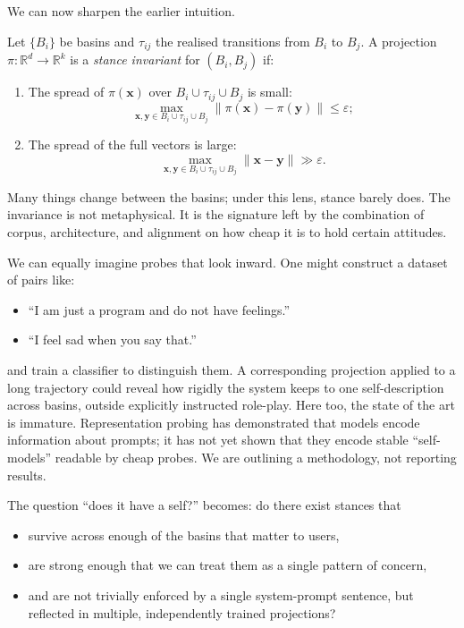 \documentclass[12pt,a4paper]{article}
\begin{document}
We can now sharpen the earlier intuition.

\begin{formalbox}[title={Stance invariants on routes}]
Let $\{B_i\}$ be basins and $\tau_{ij}$ the realised transitions from $B_i$ to $B_j$. A projection $\pi : \mathbb{R}^d \to \mathbb{R}^k$ is a \emph{stance invariant} for $(B_i,B_j)$ if:
\begin{enumerate}
  \item The spread of $\pi(\mathbf{x})$ over $B_i \cup \tau_{ij} \cup B_j$ is small:
  \[
  \max_{\mathbf{x},\mathbf{y} \in B_i \cup \tau_{ij} \cup B_j} \|\pi(\mathbf{x}) - \pi(\mathbf{y})\| \le \varepsilon;
  \]
  \item The spread of the full vectors is large:
  \[
  \max_{\mathbf{x},\mathbf{y} \in B_i \cup \tau_{ij} \cup B_j} \|\mathbf{x} - \mathbf{y}\| \gg \varepsilon.
  \]
\end{enumerate}
\end{formalbox}

Many things change between the basins; under this lens, stance barely does. The invariance is not metaphysical. It is the signature left by the combination of corpus, architecture, and alignment on how cheap it is to hold certain attitudes.

We can equally imagine probes that look inward. One might construct a dataset of pairs like:

\begin{itemize}
  \item ``I am just a program and do not have feelings.''
  \item ``I feel sad when you say that.''
\end{itemize}

and train a classifier to distinguish them. A corresponding projection applied to a long trajectory could reveal how rigidly the system keeps to one self-description across basins, outside explicitly instructed role-play. Here too, the state of the art is immature. Representation probing has demonstrated that models encode information about prompts; it has not yet shown that they encode stable ``self-models'' readable by cheap probes. We are outlining a methodology, not reporting results.

The question ``does it have a self?'' becomes: do there exist stances that

\begin{itemize}
  \item survive across enough of the basins that matter to users,
  \item are strong enough that we can treat them as a single pattern of concern,
  \item and are not trivially enforced by a single system-prompt sentence, but reflected in multiple, independently trained projections?
\end{itemize}
\end{document}
